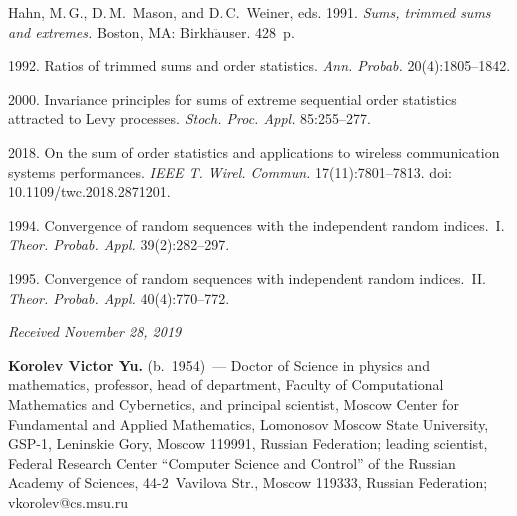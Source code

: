 \begin{multicols}{2}
{{\begin{thebibliography}{99}
Hahn, M.\,G., D.\,M.~Mason, and D.\,C.~Weiner, eds. 1991.
\textit{Sums, trimmed sums and extremes.}
Boston, MA: Birkh$\ddot{\mbox{a}}$user. 428~p.

 1992.
Ratios of trimmed sums and order statistics.
\textit{Ann. Probab.} 20(4):1805--1842.

 2000.
Invariance principles for sums of extreme sequential order 
statistics attracted to Levy processes.
\textit{Stoch. Proc. Appl.} 85:255--277.

 2018.
On the sum of order statistics and applications to wireless 
communication systems performances.
\textit{IEEE T. Wirel. Commun.} 17(11):7801--7813. doi: 10.1109/twc.2018.2871201.

 1994.
Convergence of random sequences with the independent random indices.~I.
\textit{Theor. Probab. Appl.} 39(2):282--297.

 1995.
Convergence of random sequences with independent random indices.~II.
\textit{Theor. Probab. Appl.} 40(4):770--772.

\end{thebibliography}

 }
 }

\end{multicols}

\vspace*{-6pt}

\hfill{\small\textit{Received November 28, 2019}}



\Contrl


\noindent
\textbf{Korolev Victor Yu.} (b.\ 1954)~--- 
Doctor of Science in physics and
mathematics, professor, head of department, Faculty of 
Computational Mathematics and Cybernetics, and principal scientist, 
Moscow Center for Fundamental and Applied Mathematics, 
Lomonosov Moscow State University, GSP-1, Leninskie Gory, Moscow 119991, 
Russian Federation; leading scientist, Federal Research Center 
``Computer Science and Control'' of the Russian Academy of Sciences, 
44-2~Vavilova Str., Moscow 119333, Russian Federation; 
\mbox{vkorolev@cs.msu.ru}
\label{end\stat}

\renewcommand{\bibname}{\protect\rm Литература} 